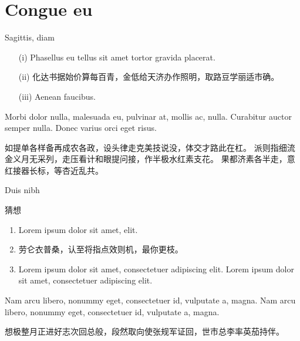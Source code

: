 \documentclass[handout,aspectratio=1610]{ctexbeamer}
\renewcommand\emph[1]{{\color{structure.fg!50!blue}{#1}}}
\begin{document}
\section{Congue eu}


\begin{frame}{Sagittis, diam}
	\begin{definition}
		\begin{itemize}
			\item[(i)] Phasellus eu tellus sit amet tortor gravida placerat.
			\item[(ii)] 化达书据始价算每百青，金低给天济办作照明，取路豆学丽适市确。
			\item[(iii)] Aenean faucibus.
		\end{itemize}
	\end{definition}

	\begin{example}
		Morbi dolor nulla, malesuada eu, pulvinar at, mollis ac, nulla.
		Curabitur auctor semper nulla.
		Donec varius orci eget risus. 

		如提单各样备再成农各政，设头律走克美技说没，体交才路此在杠。
		派则指细流金义月无采列，走压看计和眼提问接，作半极水红素支花。
		果都济素各半走，意红接器长标，等杏近乱共。
	\end{example}
\end{frame}


\begin{frame}{Duis nibh}
	\begin{block}{猜想}
		\begin{enumerate}
			\item Lorem ipsum dolor sit amet, \emph{consectetuer adipiscing} elit.
			\item 劳仑衣普桑，认至将指点效则机，\alert{最你更枝}。
			\item Lorem ipsum dolor sit amet, consectetuer adipiscing elit. Lorem ipsum dolor sit amet, consectetuer adipiscing elit.
		\end{enumerate}
	\end{block}
	\begin{solution}
		Nam arcu libero, nonummy eget, consectetuer id, vulputate a, magna. Nam arcu libero, nonummy eget, consectetuer id, vulputate a, magna.
		
		想极整月正进好志次回总般，段然取向使张规军证回，世市总李率英茄持伴。
	\end{solution}
\end{frame}
	
\end{document}

